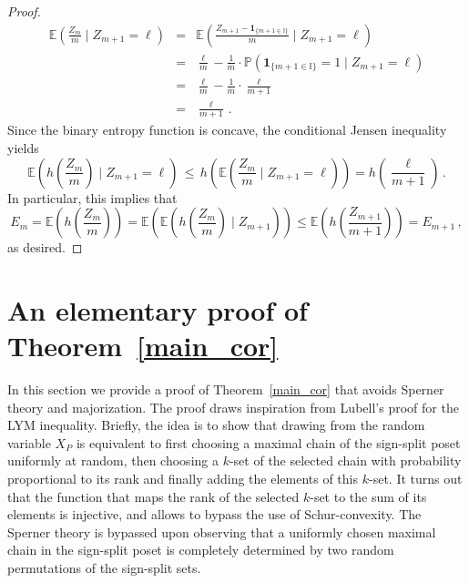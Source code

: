 \documentclass[11pt]{article}
\newcommand{\Prb}{\mathbb{P}}
\newcommand{\Exp}{\mathbb{E}}
\begin{document}
\begin{proof}
\begin{eqnarray*}
\Exp\left(\frac{Z_m}{m} \mid Z_{m+1}=\ell \right) &=&  
\Exp\left(\frac{Z_{m+1}-\mathbf{1}_{\{m+1\in\mathbb{I}\}}}{m} \mid Z_{m+1}=\ell \right)\\
&=& \frac{\ell}{m} - \frac{1}{m}\cdot \Prb(\mathbf{1}_{\{m+1\in\mathbb{I}\}}= 1 \mid Z_{m+1}=\ell)\\
&=& \frac{\ell}{m} -\frac{1}{m}\cdot \frac{\ell}{m+1}\\
&=& \frac{\ell}{m+1} \, .
\end{eqnarray*}
Since the binary entropy function is concave, the conditional  Jensen inequality yields 
\[
\Exp\left(h\left(\frac{Z_m}{m}\right) \mid Z_{m+1}=\ell \right) \,\le\, h\left(\Exp\left(\frac{Z_m}{m} \mid Z_{m+1}=\ell\right)\right) = h\left( \frac{\ell}{m+1}\right) \, .
\]
In particular, this implies that 
\[
E_m=\Exp\left(h\left(\frac{Z_m}{m}\right)\right) = 
\Exp\left( \Exp\left(h\left(\frac{Z_m}{m}\right) \mid Z_{m+1}  \right)\right) \le \Exp\left(h\left(\frac{Z_{m+1}}{m+1}\right)  \right)= E_{m+1} \, ,
\]
as desired.  
\end{proof}



\section{An elementary proof of Theorem~\ref{main_cor}}
\label{Lubell_proof}

In this section we provide a proof of Theorem~\ref{main_cor} that avoids Sperner theory and majorization.  The proof draws inspiration from Lubell's proof for the LYM inequality.
Briefly, the idea is to show that drawing from the  random variable $X_P$ 
is equivalent to first choosing  a  maximal chain of the sign-split poset uniformly at random, then choosing a $k$-set of the selected chain with probability proportional to its rank and finally  adding the elements 
of this $k$-set. 
It turns out that the function that maps the rank of the selected $k$-set  to the sum of its elements is  injective, and  allows to bypass the use of Schur-convexity. 
The Sperner theory  is bypassed upon observing that a uniformly chosen maximal chain in the sign-split poset is completely determined by two random permutations of the sign-split sets. 
\end{document}
